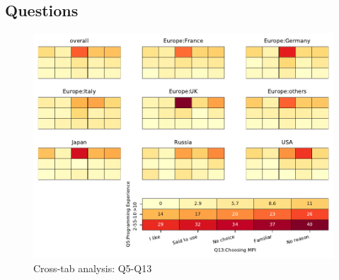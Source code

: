 
\subsection{Questions}


\begin{figure}
\begin{center}
\includegraphics[width=12cm]{../pdfs/Q5-Q13.pdf}
\caption{Cross-tab analysis: Q5-Q13}
\label{fig:Q5-Q13}
\end{center}
\end{figure}
